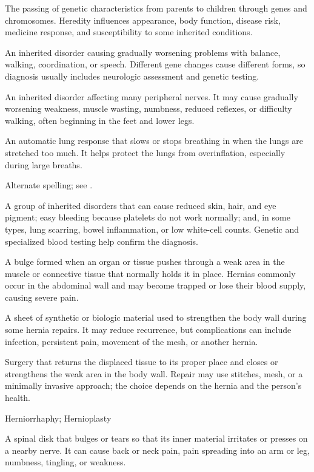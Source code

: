  The passing of genetic characteristics from parents to children through genes and chromosomes. Heredity influences appearance, body function, disease risk, medicine response, and susceptibility to some inherited conditions.

 An inherited disorder causing gradually worsening problems with balance, walking, coordination, or speech. Different gene changes cause different forms, so diagnosis usually includes neurologic assessment and genetic testing.

 An inherited disorder affecting many peripheral nerves. It may cause gradually worsening weakness, muscle wasting, numbness, reduced reflexes, or difficulty walking, often beginning in the feet and lower legs.

 An automatic lung response that slows or stops breathing in when the lungs are stretched too much. It helps protect the lungs from overinflation, especially during large breaths.

 Alternate spelling; see .

 A group of inherited disorders that can cause reduced skin, hair, and eye pigment; easy bleeding because platelets do not work normally; and, in some types, lung scarring, bowel inflammation, or low white-cell counts. Genetic and specialized blood testing help confirm the diagnosis.

 A bulge formed when an organ or tissue pushes through a weak area in the muscle or connective tissue that normally holds it in place. Hernias commonly occur in the abdominal wall and may become trapped or lose their blood supply, causing severe pain.

 A sheet of synthetic or biologic material used to strengthen the body wall during some hernia repairs. It may reduce recurrence, but complications can include infection, persistent pain, movement of the mesh, or another hernia.

 Surgery that returns the displaced tissue to its proper place and closes or strengthens the weak area in the body wall. Repair may use stitches, mesh, or a minimally invasive approach; the choice depends on the hernia and the person’s health.

\synonyms
Herniorrhaphy; Hernioplasty

 A spinal disk that bulges or tears so that its inner material irritates or presses on a nearby nerve. It can cause back or neck pain, pain spreading into an arm or leg, numbness, tingling, or weakness.

